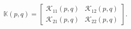 \begin{equation}
\mathbb{K}\left( p,q\right) =\left[ 
\begin{array}{cc}
\mathcal{K}_{11}\left( p,q\right) & \mathcal{K}_{12}\left( p,q\right) \\ 
\mathcal{K}_{21}\left( p,q\right) & \mathcal{K}_{22}\left( p,q\right)
\end{array}
\right] .
\end{equation}

